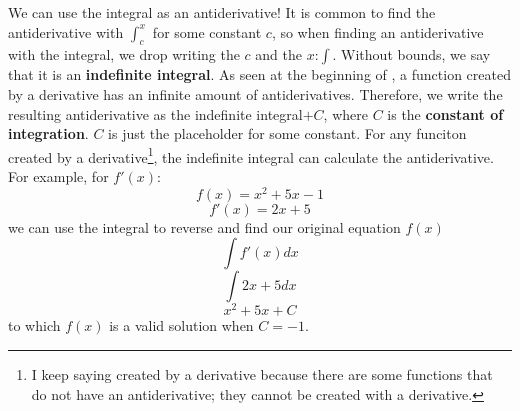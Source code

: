 \documentclass[../revisedmain.tex]{subfiles}
\begin{document}
We can use the integral as an antiderivative! It is common to find the antiderivative with $\int_{c}^{x}$ for some constant $c$, so when finding an antiderivative with the integral, we drop writing the $c$ and the $x$:$\int$. Without bounds, we say that it is an \textbf{indefinite integral}. As seen at the beginning of , a function created by a derivative has an infinite amount of antiderivatives. Therefore, we write the resulting antiderivative as the indefinite integral$+C$, where $C$ is the \textbf{constant of integration}. $C$ is just the placeholder for some constant. For any funciton created by a derivative\footnote{I keep saying created by a derivative because there are some functions that do not have an antiderivative; they cannot be created with a derivative.}, the indefinite integral can calculate the antiderivative. For example, for $f'(x)$:$$f(x)=x^2+5x-1$$$$f'(x)=2x+5$$we can use the integral to reverse and find our original equation $f(x)$$$\int f'(x)dx$$$$\int 2x+5dx$$$$x^2+5x+C$$to which $f(x)$ is a valid solution when $C=-1$.
\end{document}
